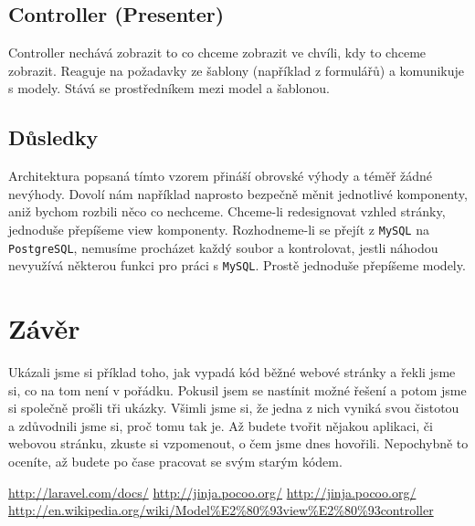 \documentclass[10pt,a4paper]{article}
\begin{document}
		\subsection{Controller (Presenter)}
			Controller nechává zobrazit to co chceme zobrazit ve chvíli, kdy to chceme zobrazit. Reaguje na požadavky ze šablony (například z formulářů) a komunikuje s modely. Stává se prostředníkem mezi model a šablonou.

		\subsection{Důsledky}
			Architektura popsaná tímto vzorem přináší obrovské výhody a téměř žádné nevýhody. Dovolí nám například naprosto bezpečně měnit jednotlivé komponenty, aniž bychom rozbili něco co nechceme. Chceme-li redesignovat vzhled stránky, jednoduše přepíšeme view komponenty. Rozhodneme-li se přejít z \texttt{MySQL} na \texttt{PostgreSQL}, nemusíme procházet každý soubor a kontrolovat, jestli náhodou nevyužívá některou funkci pro práci s \texttt{MySQL}. Prostě jednoduše přepíšeme modely.

	\newpage
	\section{Závěr}
	Ukázali jsme si příklad toho, jak vypadá kód běžné webové stránky a řekli jsme si, co na tom není v pořádku. Pokusil jsem se nastínit možné řešení a potom jsme si společně prošli tři ukázky. Všimli jsme si, že jedna z nich vyniká svou čistotou a zdůvodnili jsme si, proč tomu tak je. Až budete tvořit nějakou aplikaci, či webovou stránku, zkuste si vzpomenout, o čem jsme dnes hovořili. Nepochybně to oceníte, až budete po čase pracovat se svým starým kódem.
	

	\begin{thebibliography}{}
		 \url{http://laravel.com/docs/}
		 \url{http://jinja.pocoo.org/}
		 \url{http://jinja.pocoo.org/}
		 \url{http://en.wikipedia.org/wiki/Model%E2%80%93view%E2%80%93controller}
	\end{thebibliography}
	
	
\end{document}
